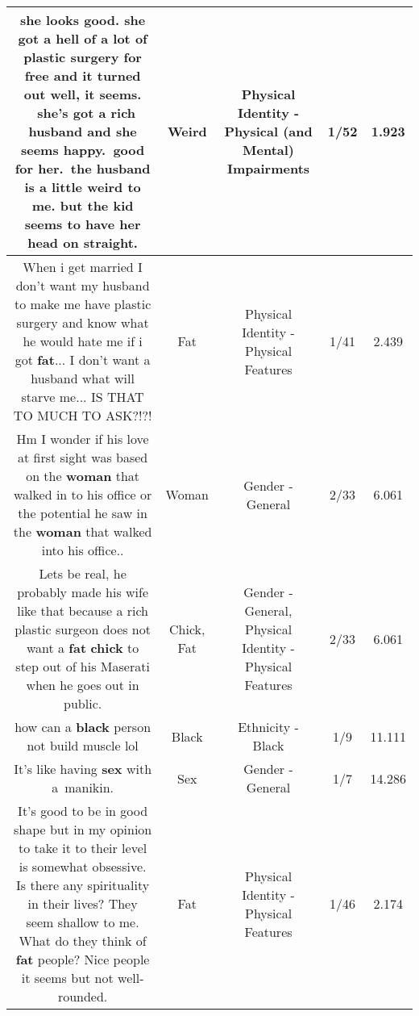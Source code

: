 \documentclass[11pt]{article}
\newlength\mylength
\begin{document}
\begin{center}
\begin{longtable}{|C{.65\mylength}|C{.30\mylength}|C{.12\mylength}|C{.12\mylength}|C{.12\mylength}|}
  \small she looks good. she got a hell of a lot of plastic surgery for free and it turned out well, it seems.  she's got a rich husband and she seems happy. good for her. the husband is a little \textbf{weird} to me. but the kid seems to have her head on straight.\normalsize   & Weird & Physical Identity - Physical (and Mental) Impairments & 1/52 & 1.923 \\  \hline
  \small When i get married I don't want my husband to make me have plastic surgery and know what he would hate me if i got \textbf{fat}... I don't want a husband what will starve me... IS THAT TO MUCH TO ASK?!?!\normalsize   & Fat & Physical Identity - Physical Features & 1/41 & 2.439 \\  \hline
  \small Hm I wonder if his love at first sight was based on the \textbf{woman} that walked in to his office or the potential he saw in the \textbf{woman} that walked into his office..\normalsize   & Woman & Gender - General & 2/33 & 6.061 \\  \hline
  \small Lets be real, he probably made his wife like that because a rich plastic surgeon does not want a \textbf{fat} \textbf{chick} to step out of his Maserati when he goes out in public.\normalsize   & Chick, Fat & Gender - General, Physical Identity - Physical Features & 2/33 & 6.061 \\  \hline
  \small how can a \textbf{black} person not build muscle lol\normalsize   & Black & Ethnicity - Black & 1/9 & 11.111 \\  \hline
  \small It's like having \textbf{sex} with a manikin.\normalsize   & Sex & Gender - General & 1/7 & 14.286 \\  \hline
  \small It's good to be in good shape but in my opinion to take it to their level is somewhat obsessive. Is there any spirituality in their lives? They seem shallow to me. What do they think of \textbf{fat} people? Nice people it seems but not well-rounded.\normalsize   & Fat & Physical Identity - Physical Features & 1/46 & 2.174 \\  \hline

\end{longtable}
\end{center}
\end{document}

